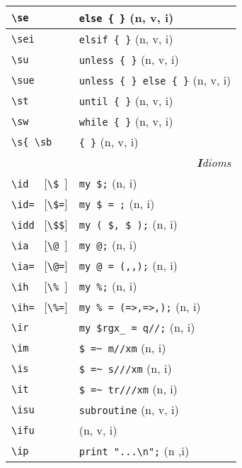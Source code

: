 \documentclass[oneside,10pt,landscape,DIV17]{scrartcl}
\begin{document}
\begin{multicols}{3}
\begin{center}
\begin{tabular}[]{|p{18mm}|p{49mm}|}
\hline \verb'\se'      & \verb'else { }'              \hfill (n, v, i)\\
\hline \verb'\sei'     & \verb'elsif { }'             \hfill (n, v, i)\\
\hline \verb'\su'      & \verb'unless { }'            \hfill (n, v, i)\\
\hline \verb'\sue'     & \verb'unless { } else { }'   \hfill (n, v, i)\\
\hline \verb'\st'      & \verb'until { }'             \hfill (n, v, i)\\
\hline \verb'\sw'      & \verb'while { }'             \hfill (n, v, i)\\
\hline \verb'\s{ \sb'  & \verb'{ }'                   \hfill (n, v, i)\\
\hline
\hline
\multicolumn{2}{|r|}{\textsl{\textbf{I}dioms}}                 \\[1.0ex]
\hline \verb'\id  ' [\verb'\$ ']  & \verb'my $;'              \hfill (n, i)   \\
\hline \verb'\id= ' [\verb'\$=']  & \verb'my $ = ;'           \hfill (n, i)   \\
\hline \verb'\idd ' [\verb'\$$']  & \verb'my ( $, $ );'       \hfill (n, i)   \\
\hline \verb'\ia  ' [\verb'\@ ']  & \verb'my @;'              \hfill (n, i)   \\
\hline \verb'\ia= ' [\verb'\@=']  & \verb'my @ = (,,);'       \hfill (n, i)   \\
\hline \verb'\ih  ' [\verb'\% ']  & \verb'my %;'              \hfill (n, i)   \\
\hline \verb'\ih= ' [\verb'\%=']  & \verb'my % = (=>,=>,);'   \hfill (n, i)   \\
%
\hline \verb'\ir'  & \verb'my $rgx_ = q//;'    \hfill (n, i)   \\
\hline \verb'\im'  & \verb'$ =~ m//xm'         \hfill (n, i)   \\
\hline \verb'\is'  & \verb'$ =~ s///xm'        \hfill (n, i)   \\
\hline \verb'\it'  & \verb'$ =~ tr///xm'       \hfill (n, i)   \\
\hline \verb'\isu' & \verb'subroutine'         \hfill (n, v, i)\\
       \verb'\ifu' &                           \hfill (n, v, i)\\
\hline \verb'\ip'  & \verb'print "...\n";'     \hfill (n ,i)   \\

\end{tabular}
\end{center}
\end{multicols}
\end{document}
